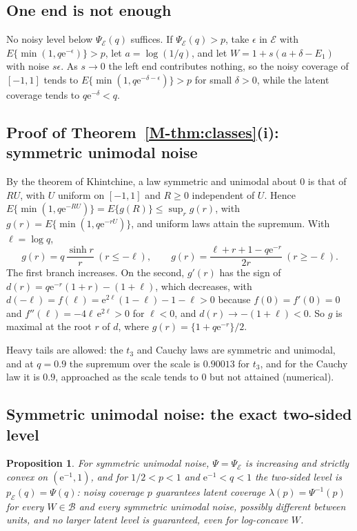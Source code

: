 \documentclass[11pt]{article}
\renewcommand{\_}{\usc\allowbreak}
\newtheorem{proposition}{Proposition}
\begin{document}
\subsection*{One end is not enough}\label{sec:s-oneend}

No noisy level below $\Psi_{\mathcal E}(q)$ suffices. If $\Psi_{\mathcal E}(q) > p$, take $\epsilon$ in $\mathcal E$ with $E\{\min(1, q \mathrm{e}^{-\epsilon})\} > p$, let $a = \log(1/q)$, and let $W = 1 + s(a + \delta - E_1)$ with noise $s\epsilon$. As $s \to 0$ the left end contributes nothing, so the noisy coverage of $[-1, 1]$ tends to $E\{\min(1, q \mathrm{e}^{-\delta - \epsilon})\} > p$ for small $\delta > 0$, while the latent coverage tends to $q \mathrm{e}^{-\delta} < q$.

\subsection*{Proof of Theorem~\ref{M-thm:classes}(i): symmetric unimodal noise}

By the theorem of Khintchine, a law symmetric and unimodal about $0$ is that of $RU$, with $U$ uniform on $[-1, 1]$ and $R \ge 0$ independent of $U$. Hence $E\{\min(1, q \mathrm{e}^{-RU})\} = E\{g(R)\} \le \sup_r g(r)$, with $g(r) = E\{\min(1, q \mathrm{e}^{-rU})\}$, and uniform laws attain the supremum. With $\ell = \log q$,
\[
g(r) = q\,\frac{\sinh r}{r}\ (r \le -\ell), \qquad g(r) = \frac{\ell + r + 1 - q \mathrm{e}^{-r}}{2r}\ (r \ge -\ell).
\]
The first branch increases. On the second, $g'(r)$ has the sign of $d(r) = q \mathrm{e}^{-r}(1 + r) - (1 + \ell)$, which decreases, with $d(-\ell) = f(\ell) = \mathrm{e}^{2\ell}(1 - \ell) - 1 - \ell > 0$ because $f(0) = f'(0) = 0$ and $f''(\ell) = -4\ell\,\mathrm{e}^{2\ell} > 0$ for $\ell < 0$, and $d(r) \to -(1 + \ell) < 0$. So $g$ is maximal at the root $r$ of $d$, where $g(r) = \{1 + q \mathrm{e}^{-r}\}/2$.

Heavy tails are allowed: the $t_3$ and Cauchy laws are symmetric and unimodal, and at $q = 0.9$ the supremum over the scale is $0.90013$ for $t_3$, and for the Cauchy law it is $0.9$, approached as the scale tends to $0$ but not attained (numerical).

\subsection*{Symmetric unimodal noise: the exact two-sided level}

\begin{proposition}\label{prop:su-exact}
For symmetric unimodal noise, $\Psi = \Psi_{\mathcal E}$ is increasing and strictly convex on $(\mathrm{e}^{-1}, 1)$, and for $1/2 < p < 1$ and $\mathrm{e}^{-1} < q < 1$ the two-sided level is $p_{\mathcal E}(q) = \Psi(q)$: noisy coverage $p$ guarantees latent coverage $\lambda(p) = \Psi^{-1}(p)$ for every $W \in \mathcal B$ and every symmetric unimodal noise, possibly different between units, and no larger latent level is guaranteed, even for log-concave $W$.
\end{proposition}
\end{document}
